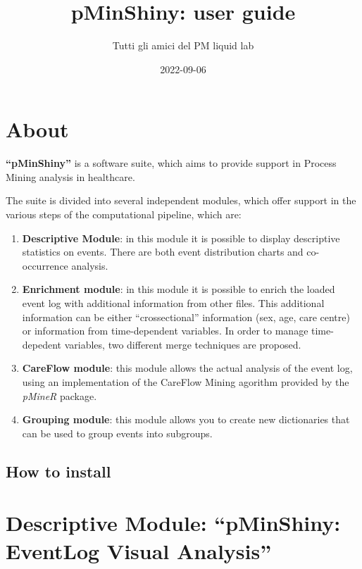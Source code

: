 \documentclass[
]{book}
\title{pMinShiny: user guide}
\author{Tutti gli amici del PM liquid lab}
\date{2022-09-06}
\begin{document}
\maketitle

{
\setcounter{tocdepth}{1}
\tableofcontents
}
\hypertarget{about}{%
\chapter{About}\label{about}}

\textbf{``pMinShiny''} is a software suite, which aims to provide support in Process Mining analysis in healthcare.

The suite is divided into several independent modules, which offer support in the various steps of the computational pipeline, which are:

\begin{enumerate}
\def\labelenumi{\arabic{enumi}.}
\item
  \textbf{Descriptive Module}: in this module it is possible to display descriptive statistics on events. There are both event distribution charts and co-occurrence analysis.
\item
  \textbf{Enrichment module}: in this module it is possible to enrich the loaded event log with additional information from other files. This additional information can be either ``crossectional'' information (sex, age, care centre) or information from time-dependent variables. In order to manage time-depedent variables, two different merge techniques are proposed.
\item
  \textbf{CareFlow module}: this module allows the actual analysis of the event log, using an implementation of the CareFlow Mining agorithm provided by the \emph{pMineR} package.
\item
  \textbf{Grouping module}: this module allows you to create new dictionaries that can be used to group events into subgroups.
\end{enumerate}

\hypertarget{how-to-install}{%
\section{How to install}\label{how-to-install}}

\hypertarget{descriptive-module-pminshiny-eventlog-visual-analysis}{%
\chapter{Descriptive Module: ``pMinShiny: EventLog Visual Analysis''}\label{descriptive-module-pminshiny-eventlog-visual-analysis}}
\end{document}
